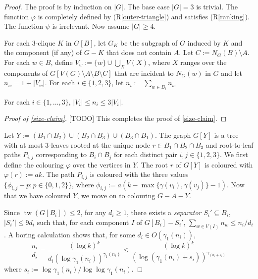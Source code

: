 \documentclass[kpfonts]{patmorin}
\DeclareMathOperator{\tw}{tw}
\theoremstyle{named}
\begin{document}
\begin{proof}
    The proof is by induction on $|G|$.  The base case $|G|=3$ is trivial. The function $\varphi$ is completely defined by (R\ref{outer-triangle}) and satisfies (R\ref{ranking}).  The function $\psi$ is irrelevant.  Now assume $|G|\ge 4$.

    For each $3$-clique $K$ in $G[B]$, let $G_K$ be the subgraph of $G$ induced by $K$ and the component (if any) of $G-K$ that does not contain $A$.
    Let $C:=N_G(B)\setminus A$.  For each $w\in B$, define $V_w:=\{w\}\cup \bigcup_X V(X)$, where $X$ ranges over the components of $G[V(G)\setminus A\setminus B\setminus C]$ that are incident to $N_G(w)$ in $G$ and let $n_w=1+|V_w|$.  For each $i\in\{1,2,3\}$, let $n_i:=\sum_{w\in B_i} n_w$

    \begin{clm}\label{size-claim}
        For each $i\in\{1,\ldots,3\}$, $|V_i|\le n_i\le 3|V_i|$.
    \end{clm}

    \begin{proof}[Proof of \cref{size-claim}]
        [TODO] This completes the proof of \cref{size-claim}.
    \end{proof}

    Let $Y:=(B_1\cap B_2)\cup(B_2\cap B_3)\cup(B_3\cap B_1)$.  The graph $G[Y]$ is a tree with at most 3-leaves rooted at the unique node $r\in B_1\cap B_2\cap B_3$ and root-to-leaf paths $P_{i,j}$ corresponding to $B_i\cap B_j$ for each distinct pair $i,j\in\{1,2,3\}$. We first define the colouring $\varphi$ over the vertices in $Y$.  The root $r$ of $G[Y]$ is coloured with $\varphi(r):=ak$. The path $P_{i,j}$ is coloured with the three values $\{\phi_{i,j}-p: p\in\{0,1,2\}\}$, where $\phi_{i,j}:=a(k-\max\{\gamma(v_i),\gamma(v_j)\}-1)$.  Now that we have coloured $Y$, we move on to colouring $G-A-Y$.

    Since $\tw(G[B_i])\le 2$, for any $d_i\ge 1$, there exists a \emph{separator} $S_i'\subseteq B_i$, $|S_i'|\le 9d_i$ such that, for each component $I$ of $G[B_i]-S_i'$, $\sum_{w\in V(I)} n_w \le n_i/d_i$. A boring calculation shows that, for some $d_i\in O(\gamma_1(n_i))$,
    \[  \frac{n_i}{d_i} = \frac{(\log k)^k}{d_i(\log \gamma_1(n_i))^{\gamma_1(n_i)}} \le
        \frac{(\log k)^k}{(\log (\gamma_1(n_i)+s_i))^{\gamma_(n_i+s_i)}}
    \]
    where $s_i:=\log \gamma_1(n_i)/\log\log \gamma_1(n_i)$.


\end{proof}
\end{document}
